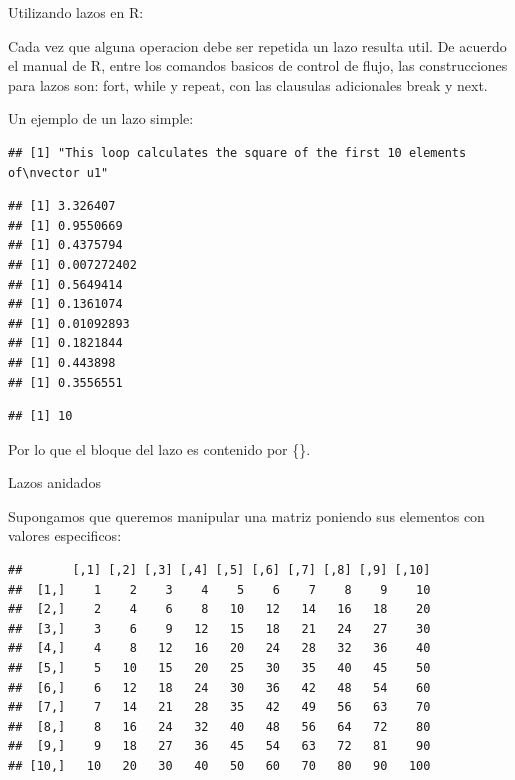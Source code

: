 \documentclass[ignorenonframetext,]{beamer}
\begin{document}
\begin{frame}[fragile]

\begin{block}{Utilizando lazos en R:}

Cada vez que alguna operacion debe ser repetida un lazo resulta util. De
acuerdo el manual de R, entre los comandos basicos de control de flujo,
las construcciones para lazos son: fort, while y repeat, con las
clausulas adicionales break y next.

Un ejemplo de un lazo simple:

\begin{verbatim}
## [1] "This loop calculates the square of the first 10 elements of\nvector u1"
\end{verbatim}

\begin{verbatim}
## [1] 3.326407
## [1] 0.9550669
## [1] 0.4375794
## [1] 0.007272402
## [1] 0.5649414
## [1] 0.1361074
## [1] 0.01092893
## [1] 0.1821844
## [1] 0.443898
## [1] 0.3556551
\end{verbatim}

\begin{verbatim}
## [1] 10
\end{verbatim}

Por lo que el bloque del lazo es contenido por \{\}.

\end{block}

\end{frame}

\begin{frame}[fragile]

\begin{block}{Lazos anidados}

Supongamos que queremos manipular una matriz poniendo sus elementos con
valores especificos:

\begin{verbatim}
##       [,1] [,2] [,3] [,4] [,5] [,6] [,7] [,8] [,9] [,10]
##  [1,]    1    2    3    4    5    6    7    8    9    10
##  [2,]    2    4    6    8   10   12   14   16   18    20
##  [3,]    3    6    9   12   15   18   21   24   27    30
##  [4,]    4    8   12   16   20   24   28   32   36    40
##  [5,]    5   10   15   20   25   30   35   40   45    50
##  [6,]    6   12   18   24   30   36   42   48   54    60
##  [7,]    7   14   21   28   35   42   49   56   63    70
##  [8,]    8   16   24   32   40   48   56   64   72    80
##  [9,]    9   18   27   36   45   54   63   72   81    90
## [10,]   10   20   30   40   50   60   70   80   90   100
\end{verbatim}

\end{block}

\end{frame}
\end{document}
